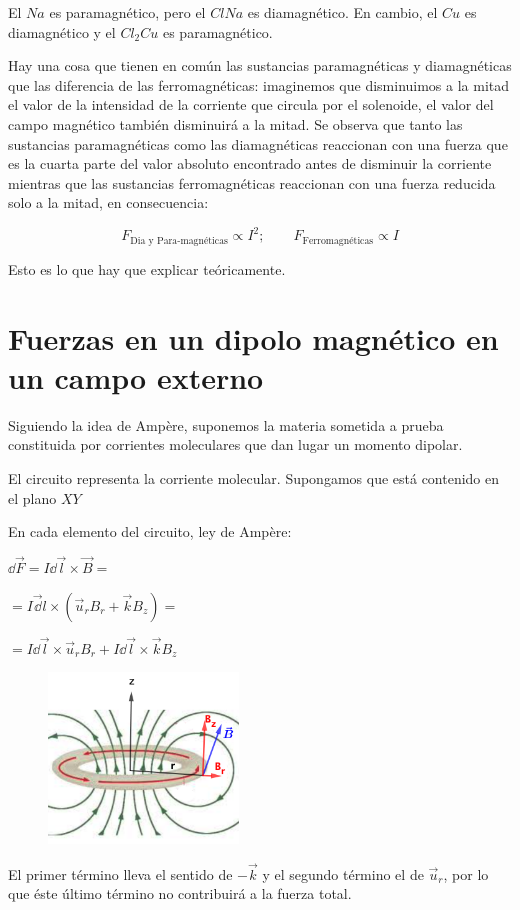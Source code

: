 El $Na$ es paramagnético, pero el $ClNa$ es diamagnético. En cambio, el $Cu$ es diamagnético y el $Cl_2Cu$ es paramagnético.

Hay una cosa que tienen en común las sustancias paramagnéticas y diamagnéticas que las diferencia de las ferromagnéticas: imaginemos que disminuimos a la mitad el valor de la intensidad de la corriente que circula por el solenoide, el valor del campo magnético también disminuirá a la mitad. Se observa que tanto las sustancias paramagnéticas como las diamagnéticas reaccionan con una fuerza que es la cuarta parte del valor absoluto encontrado antes de disminuir la corriente mientras que las sustancias ferromagnéticas reaccionan con una fuerza reducida solo a la mitad, en consecuencia:

$$F_{\text{Dia y Para-magnéticas}} \propto I^2; \qquad F_{\text{Ferromagnéticas}} \propto I$$

Esto es lo que hay que explicar teóricamente.

\section[Fuerzas en un dipolo magnético en un campo externo]{Fuerzas en un dipolo magnético en un campo externo}


Siguiendo la idea de Ampère, suponemos la materia sometida a prueba constituida por corrientes moleculares que dan lugar un momento dipolar.


\begin{multicols}{2}
El circuito representa la corriente molecular. Supongamos que está contenido en el plano $XY$

En cada elemento del circuito, ley de Ampère:

$\dd \vec F = I \dd \vec l \times \vec B=$

$=I\vec \dd l \times (\vec u_r B_r + \vec k B_z)=$

$=I\dd \vec l \times \vec u_r B_r + I\dd \vec l \times \vec k B_z$
\begin{figure}[H]
	\centering
	\includegraphics[width=0.45\textwidth]{imagenes/imagenes28/T28IM02.png}
\end{figure}	
\end{multicols}
El primer término lleva el sentido de $-\vec k$ y el segundo término el de $\vec u_r$, por lo que éste último término no contribuirá a la fuerza total.

